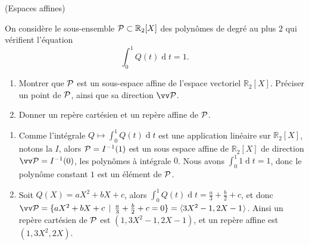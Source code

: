 \documentclass[a4paper,12pt,reqno]{amsart}
\begin{document}
\begin{exo} (Espaces affines)

  On considère le sous-ensemble $\mathcal{P} \subset \mathbb{R}_{2}[X]$ des polynômes de degré au plus $2$ qui vérifient l'équation
  \[
    \int_{0}^{1}Q(t)\operatorname{d}\!t=1.
  \]
  \begin{enumerate}
    \item Montrer que $\mathcal{P}$ est un sous-espace affine de l'espace vectoriel $\mathbb{R}_{2}[X]$. Préciser un point de $\mathcal{P}$, ainsi que sa direction $\ev{P}$.
    \item Donner un repère cartésien et un repère affine de $\mathcal{P}$.
  \end{enumerate}



\end{exo}

\begin{solution}
  \begin{enumerate}
    \item Comme l'intégrale $Q \mapsto \int_{0}^{1}Q(t)\operatorname{d}\!t $ est une application linéaire sur $\mathbb{R}_{2}[X]$, notons la $I$, alors $\mathcal{P}=I^{-1}(1)$ est un sous espace affine de $\mathbb{R}_{2}[X]$ de direction $\ev{P}=I^{-1}(0)$, les polynômes à intégrale $0$. Nous avons $\int_{0}^{1}1\operatorname{d}\!t=1$, donc le polynôme constant $1$ est un élément de $\mathcal{P}$.
    \item Soit $Q(X)=aX^{2}+bX+c$, alors $\int_{0}^{1}Q(t)\operatorname{d}\!t=\frac{a}{3}+\frac{b}{2}+c$, et donc $\ev{P} = \{aX^{2}+bX+c \,\mid\, \frac{a}{3}+\frac{b}{2}+c=0\}=\affspan{3X^{2}-1, 2X-1}$. Ainsi un repère cartésien de $\mathcal{P}$ est $\left(1,3X^{2}-1,2X-1\right)$, et un repère affine est $\left(1,3X^{2},2X\right)$.
  \end{enumerate}
\end{solution}
\end{document}
